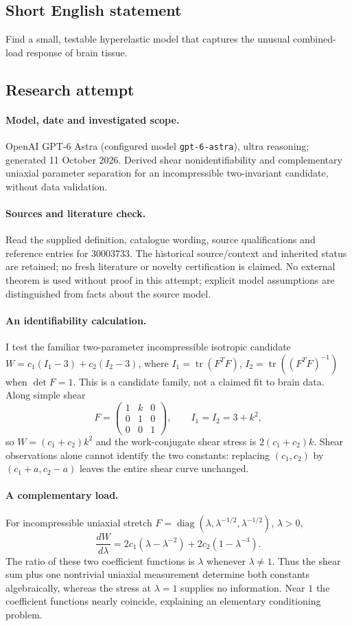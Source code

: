 \documentclass[11pt]{article}
\begin{document}
\subsection{Short English statement}
Find a small, testable hyperelastic model that captures the unusual combined-load response of brain tissue.
\subsection{Research attempt}
\paragraph{Model, date and investigated scope.}
OpenAI GPT-6 Astra (configured model \texttt{gpt-6-astra}), ultra reasoning; generated 11 October 2026. Derived shear nonidentifiability and complementary uniaxial parameter separation for an incompressible two-invariant candidate, without data validation.

\paragraph{Sources and literature check.}
Read the supplied definition, catalogue wording, source qualifications and reference entries for 30003733. The historical source/context and inherited status are retained; no fresh literature or novelty certification is claimed. No external theorem is used without proof in this attempt; explicit model assumptions are distinguished from facts about the source model.

\paragraph{An identifiability calculation.} I test the familiar two-parameter incompressible isotropic candidate \(W=c_1(I_1-3)+c_2(I_2-3)\), where \(I_1=\operatorname{tr}(F^TF)\), \(I_2=\operatorname{tr}((F^TF)^{-1})\) when \(\det F=1\). This is a candidate family, not a claimed fit to brain data. Along simple shear
\[
 F=\begin{pmatrix}1&k&0\\0&1&0\\0&0&1\end{pmatrix},
 \qquad I_1=I_2=3+k^2,
\]
so \(W=(c_1+c_2)k^2\) and the work-conjugate shear stress is \(2(c_1+c_2)k\). Shear observations alone cannot identify the two constants: replacing \((c_1,c_2)\) by \((c_1+a,c_2-a)\) leaves the entire shear curve unchanged.
\paragraph{A complementary load.} For incompressible uniaxial stretch \(F=\operatorname{diag}(\lambda,\lambda^{-1/2},\lambda^{-1/2})\), \(\lambda>0\),
\[
 \frac{dW}{d\lambda}=2c_1(\lambda-\lambda^{-2})+2c_2(1-\lambda^{-3}).
\]
The ratio of these two coefficient functions is \(\lambda\) whenever \(\lambda\ne1\). Thus the shear sum plus one nontrivial uniaxial measurement determine both constants algebraically, whereas the stress at \(\lambda=1\) supplies no information. Near \(1\) the coefficient functions nearly coincide, explaining an elementary conditioning problem.
\end{document}
